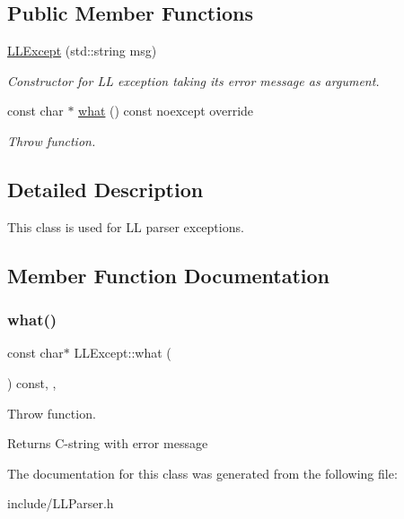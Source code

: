 \subsection*{Public Member Functions}
\begin{DoxyCompactItemize}
\item 
\mbox{\label{classLLExcept_a7ba6f4350aa309e310a67ba732e5c802}} 
\hyperlink{classLLExcept_a7ba6f4350aa309e310a67ba732e5c802}{L\+L\+Except} (std\+::string msg)
\begin{DoxyCompactList}\small\item\em Constructor for LL exception taking its error message as argument. \end{DoxyCompactList}\item 
const char $\ast$ \hyperlink{classLLExcept_a15bcfc8d70217d9532280cf419ee7fa9}{what} () const noexcept override
\begin{DoxyCompactList}\small\item\em Throw function. \end{DoxyCompactList}\end{DoxyCompactItemize}


\subsection{Detailed Description}
This class is used for LL parser exceptions. 

\subsection{Member Function Documentation}
\mbox{\label{classLLExcept_a15bcfc8d70217d9532280cf419ee7fa9}} 
\subsubsection{\texorpdfstring{what()}{what()}}
{\footnotesize\ttfamily const char$\ast$ L\+L\+Except\+::what (\begin{DoxyParamCaption}{ }\end{DoxyParamCaption}) const\hspace{0.3cm}{\ttfamily [inline]}, {\ttfamily [override]}, {\ttfamily [noexcept]}}



Throw function. 

\begin{DoxyReturn}{Returns}
C-\/string with error message 
\end{DoxyReturn}


The documentation for this class was generated from the following file\+:\begin{DoxyCompactItemize}
\item 
include/L\+L\+Parser.\+h\end{DoxyCompactItemize}
